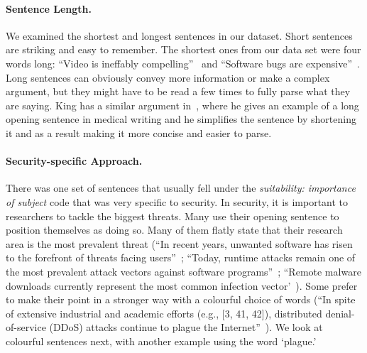 \documentclass[sigconf]{acmart}
\begin{document}
	\paragraph{Sentence Length.} We examined the shortest and longest sentences in our dataset. Short sentences are striking and easy to remember. The shortest ones from our data set were four words long: ``Video is ineffably compelling''~\cite{brocker2014iseeyou} and ``Software bugs are expensive''~\cite{rebert2014optimizing}. Long sentences can obviously convey more information or make a complex argument, but they might have to be read a few times to fully parse what they are saying. King has a similar argument in~\cite{king1967opening}, where he gives an example of a long opening sentence in medical writing and he simplifies the sentence by shortening it and as a result making it more concise and easier to parse.

	\paragraph{Security-specific Approach.} There was one set of sentences that usually fell under the \textit{suitability: importance of subject} code that was very specific to security. In security, it is important to researchers to tackle the biggest threats. Many use their opening sentence to position themselves as doing so. Many of them flatly state that their research area is the most prevalent threat (``In recent years, unwanted software has risen to the forefront of threats facing users''~\cite{thomas2016investigating}; ``Today, runtime attacks remain one of the most prevalent attack vectors against software programs''~\cite{davi2014stitching}; ``Remote malware downloads currently represent the most common infection vector'~\cite{nelms2015webwitness}). Some prefer to make their point in a stronger way with a colourful choice of words (``In spite of extensive industrial and academic efforts (e.g., [3, 41, 42]), distributed denial-of-service (DDoS) attacks continue to plague the Internet''~\cite{fayaz2015bohatei}). We look at colourful sentences next, with another example using the word `plague.'
\end{document}
